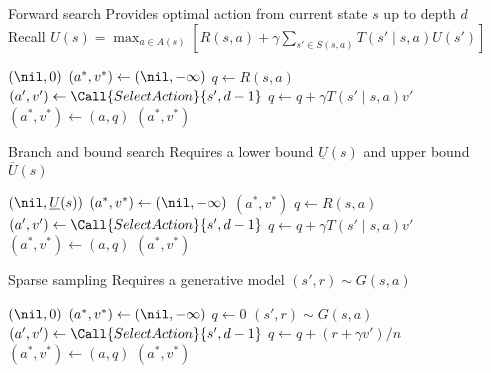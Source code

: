\documentclass[handout]{dmu}
\begin{document}
\begin{frame}{Forward search}
Provides optimal action from current state $s$ up to depth $d$\\
Recall $U(s) = \max_{a \in A(s)} [R(s,a) + \gamma \sum_{s' \in S(s, a)} T(s' \mid s, a) U(s')]$
\vfill
\begin{algorithmic}[1]
	\State \Return $(\nil, 0)$
\EndIf
\State $(a^*, v^*) \gets (\nil, -\infty)$
	\State $q \gets R(s, a)$
		\State $(a', v') \gets \Call{SelectAction}{s', d - 1}$
		\State $q \gets q + \gamma T(s' \mid s, a) v'$
	\EndFor
		\State $(a^*, v^*) \gets (a, q)$
	\EndIf
\EndFor
\State \Return $(a^*, v^*)$
\EndFunction
\end{algorithmic}
\vfill
{}
\end{frame}

\begin{frame}{Branch and bound search}
Requires a lower bound $\underline U(s)$ and upper bound $\overline U(s)$
\vfill
\begin{algorithmic}[1]
	\State \Return $(\nil, \underline U(s))$ \label{line:lowerbound}
\EndIf
\State $(a^*, v^*) \gets (\nil, -\infty)$
 \label{line:action ordering}
	 \label{line:prune}
		\State \Return $(a^*, v^*)$
	\EndIf
	\State $q \gets R(s, a)$
		\State $(a', v') \gets \Call{SelectAction}{s', d - 1}$
		\State $q \gets q + \gamma T(s' \mid s, a) v'$
	\EndFor
		\State $(a^*, v^*) \gets (a, q)$
	\EndIf
\EndFor
\State \Return $(a^*, v^*)$
\EndFunction
\end{algorithmic}
\end{frame}

\begin{frame}{Sparse sampling}
Requires a generative model $(s', r) \sim G(s, a)$
\vfill
\begin{algorithmic}[1]
	\State \Return $(\nil, 0)$
\EndIf
\State $(a^*, v^*) \gets (\nil, -\infty)$
	\State $q \gets 0$
		\State $(s', r) \sim G(s, a)$ \label{line:sparse sample draw}
		\State $(a', v') \gets \Call{SelectAction}{s', d - 1}$
		\State $q \gets q + (r + \gamma v')/n$
	\EndFor
		\State $(a^*, v^*) \gets (a, q)$
	\EndIf
\EndFor
\State \Return $(a^*, v^*)$
\EndFunction
\end{algorithmic}
\end{frame}
\end{document}
